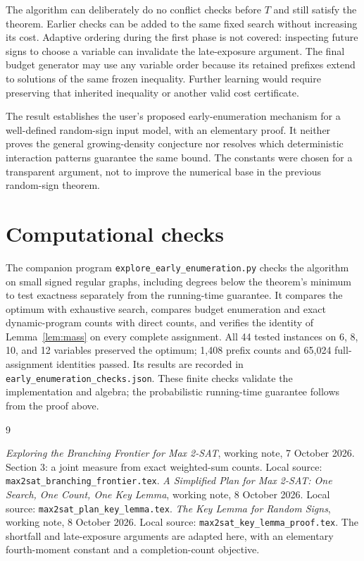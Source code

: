 \documentclass[11pt,a4paper]{article}
\theoremstyle{remark}
\begin{document}
The algorithm can deliberately do no conflict checks before $T$ and
still satisfy the theorem. Earlier checks can be added to the same fixed
search without increasing its cost. Adaptive ordering during the first
phase is not covered: inspecting future signs to choose a variable can
invalidate the late-exposure argument. The final budget generator may
use any variable order because its retained prefixes extend to solutions
of the same frozen inequality. Further learning would require preserving
that inherited inequality or another valid cost certificate.

The result establishes the user's proposed early-enumeration mechanism
for a well-defined random-sign input model, with an elementary proof.
It neither proves the general growing-density conjecture nor resolves
which deterministic interaction patterns guarantee the same bound.
The constants were chosen for a transparent argument, not to improve
the numerical base in the previous random-sign theorem.

\section{Computational checks}

The companion program \texttt{explore\_early\_enumeration.py} checks the
algorithm on small signed regular graphs, including degrees below the
theorem's minimum to test exactness separately from the running-time
guarantee. It compares the optimum with exhaustive search, compares
budget enumeration and exact dynamic-program counts with direct counts,
and verifies the identity of Lemma~\ref{lem:mass} on every complete
assignment. All 44 tested instances on 6, 8, 10, and 12 variables
preserved the optimum; 1,408 prefix counts and 65,024 full-assignment
identities passed. Its results are recorded in
\texttt{early\_enumeration\_checks.json}.
These finite checks validate the implementation and algebra; the
probabilistic running-time guarantee follows from the proof above.

\begin{thebibliography}{9}
\small\raggedright
{}
\emph{Exploring the Branching Frontier for Max 2-SAT}, working note,
7 October 2026. Section 3: a joint measure from exact weighted-sum counts.
Local source: \texttt{max2sat\_branching\_frontier.tex}.
\emph{A Simplified Plan for Max 2-SAT: One Search, One Count, One Key Lemma},
working note, 8 October 2026. Local source:
\texttt{max2sat\_plan\_key\_lemma.tex}.
\emph{The Key Lemma for Random Signs}, working note, 8 October 2026.
Local source: \texttt{max2sat\_key\_lemma\_proof.tex}.
The shortfall and late-exposure arguments are adapted here, with an
elementary fourth-moment constant and a completion-count objective.
\end{thebibliography}
\end{document}
